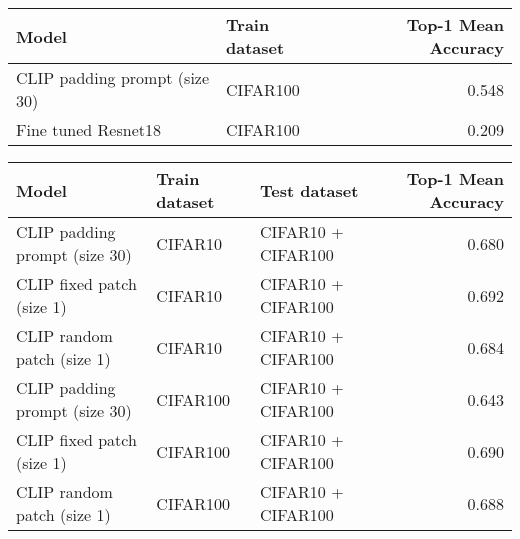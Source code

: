\documentclass[11pt]{article}
\begin{document}
\begin{center}
\begin{tabular}{llr}
Model & Train dataset & Top-1 Mean Accuracy\\
\hline
CLIP padding prompt (size 30) & CIFAR100 & 0.548\\
Fine tuned Resnet18 & CIFAR100 & 0.209\\
\end{tabular}
\end{center}



\begin{center}
\begin{tabular}{lllr}
Model & Train dataset & Test dataset & Top-1 Mean Accuracy\\
\hline
CLIP padding prompt (size 30) & CIFAR10 & CIFAR10 + CIFAR100 & 0.680\\
CLIP fixed patch (size 1) & CIFAR10 & CIFAR10 + CIFAR100 & 0.692\\
CLIP random patch (size 1) & CIFAR10 & CIFAR10 + CIFAR100 & 0.684\\
CLIP padding prompt (size 30) & CIFAR100 & CIFAR10 + CIFAR100 & 0.643\\
CLIP fixed patch (size 1) & CIFAR100 & CIFAR10 + CIFAR100 & 0.690\\
CLIP random patch (size 1) & CIFAR100 & CIFAR10 + CIFAR100 & 0.688\\
\end{tabular}
\end{center}
\end{document}
